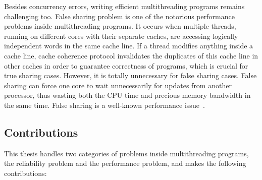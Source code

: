 Besides concurrency errors, writing efficient multithreading programs remains challenging too. False sharing problem is one of the notorious performance problems inside multithreading programs. It occurs when multiple threads, running on different cores with their separate caches, are accessing logically independent words in the same cache line. If a thread modifies anything inside a cache line, cache coherence protocol invalidates the duplicates of this cache line in other caches in order to guarantee correctness of programs, which is crucial for true sharing cases. However, it is totally unnecessary for false sharing cases. False sharing can force one core to wait unnecessarily for updates from another processor, thus wasting both the CPU time and precious memory bandwidth in the same time. False sharing is a well-known performance issue~\cite{falseshare:Analysis, falseshare:effect}. 

\subsection*{Contributions}

This thesis handles two categories of problems inside multithreading programs, the reliability problem and the performance problem, and makes the following contributions:

